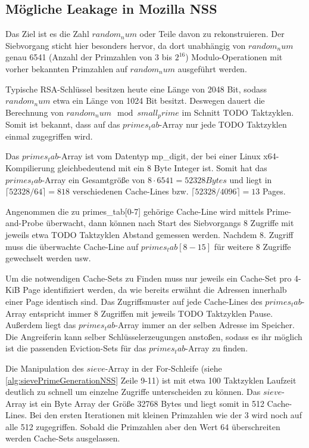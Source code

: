 \subsection{Mögliche Leakage in Mozilla NSS}

Das Ziel ist es die Zahl $random_num$ oder Teile davon zu rekonstruieren.
Der Siebvorgang sticht hier besonders hervor, da dort unabhängig von $random_num$ genau 6541 (Anzahl der Primzahlen von 3 bis $2^{16}$) Modulo-Operationen mit vorher bekannten Primzahlen auf $random_num$ ausgeführt werden.

Typische RSA-Schlüssel besitzen heute eine Länge von 2048 Bit, sodass $random_num$ etwa ein Länge von 1024 Bit besitzt.
Deswegen dauert die Berechnung von $random_num \mod small_prime$ im Schnitt TODO Taktzyklen.
Somit ist bekannt, dass auf das $primes_tab$-Array nur jede TODO Taktzyklen einmal zugegriffen wird.

Das $primes_tab$-Array ist vom Datentyp mp_digit, der bei einer Linux x64-Kompilierung gleichbedeutend mit ein 8 Byte Integer ist.
Somit hat das $primes_tab$-Array ein Gesamtgröße von $8 \cdot 6541 = 52328 Bytes$ und liegt in $\lceil 52328 / 64 \rceil = 818$ verschiedenen Cache-Lines bzw. $\lceil 52328 / 4096 \rceil = 13$ Pages.

Angenommen die zu primes_tab[0-7] gehörige Cache-Line wird mittels Prime-and-Probe überwacht, dann können nach Start des Siebvorgangs 8 Zugriffe mit jeweils etwa TODO Taktzyklen Abstand gemessen werden.
Nachdem 8. Zugriff muss die überwachte Cache-Line auf $primes_tab[8-15]$ für weitere 8 Zugriffe gewechselt werden usw.

Um die notwendigen Cache-Sets zu Finden muss nur jeweils ein Cache-Set pro 4-KiB Page identifiziert werden, da wie bereits erwähnt die Adressen innerhalb einer Page identisch sind.
Das Zugriffsmuster auf jede Cache-Lines des $primes_tab$-Array entspricht immer 8 Zugriffen mit jeweils TODO Taktzyklen Pause. Außerdem liegt das $primes_tab$-Array immer an der selben Adresse im Speicher.
Die Angreiferin kann selber Schlüsselerzeugungen anstoßen, sodass es ihr möglich ist die passenden Eviction-Sets für das $primes_tab$-Array zu finden.

Die Manipulation des $sieve$-Array in der For-Schleife (siehe \ref{alg:sievePrimeGenerationNSS} Zeile 9-11) ist mit etwa 100 Taktzyklen Laufzeit deutlich zu schnell um einzelne Zugriffe unterscheiden zu können.
Das $sieve$-Array ist ein Byte Array der Größe 32768 Bytes und liegt somit in 512 Cache-Lines.
Bei den ersten Iterationen mit kleinen Primzahlen wie der 3 wird noch auf alle 512 zugegriffen.
Sobald die Primzahlen aber den Wert 64 überschreiten werden Cache-Sets ausgelassen.

